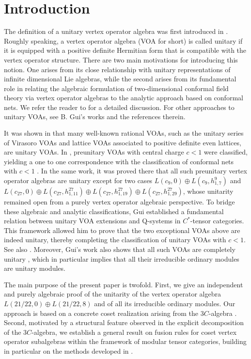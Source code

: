 \documentclass{article}
\begin{document}
	\section{Introduction}
	The definition of a unitary vertex operator algebra was first introduced in \cite{DLin1}. Roughly speaking, a vertex operator algebra (VOA for short) is called unitary if it is equipped with a positive definite Hermitian form that is compatible with the vertex operator structure. There are two main motivations for introducing this notion. One arises from its close relationship with unitary representations of infinite dimensional Lie algebras, while the second arises from its fundamental role in relating the algebraic formulation of two-dimensional conformal field theory via vertex operator algebras to the analytic approach based on conformal nets. We refer the reader to \cite{DLin1} for a detailed discussion. For other approaches to unitary VOAs, see B. Gui's works \cite{Gui1, Gui2, Gui3, Gui4} and the references therein.
	
	It was shown in \cite{DLin1} that many well-known rational VOAs, such as the unitary series of Virasoro VOAs and lattice VOAs associated to positive definite even lattices, are unitary VOAs. In \cite{DLin2}, preunitary VOAs with central charge $c<1$ were classified, yielding a one to one correspondence with the classification of conformal nets with $c<1$ \cite{KL}. In the same work, it was proved there that all such preunitary vertex operator algebras are unitary except for two cases $L(c_9, 0)\oplus L(c_9, h_{1,7}^9)$ and $L(c_{27}, 0)\oplus L(c_{27},h_{1,11}^{27})\oplus L(c_{27},h_{1,19}^{27})\oplus L(c_{27},h_{1,29}^{27})$,
	 whose unitarity remained open from a purely vertex operator algebraic perspective. To bridge these algebraic and analytic classifications, Gui \cite{Gui3} established a fundamental relation between unitary VOA extensions  and Q-systems \cite{Longo} in $C^*$-tensor categories. This framework allowed him to prove that the two exceptional VOAs above are indeed unitary, thereby  completing the classification of unitary VOAs with $c<1$.  See also \cite{CGGH}.
 Moreover, Gui's work also shows that all such VOAs are completely unitary \cite{Gui3}, which in particular implies that all their irreducible ordinary modules are unitary modules.
	
	 The main purpose of the present paper is twofold. First, we give an independent and purely algebraic proof of the unitarity of the vertex operator algebra $L(21/22, 0)\oplus L(21/22, 8)$ and of all its irreducible ordinary modules. Our approach is based on a concrete coset realization arising from the $3C$-algebra \cite{LYY}. Second, motivated by a structural feature observed in the explicit decomposition of the $3C$-algebra, we establish a general result on fusion rules for coset vertex operator subalgebras within the framework of modular tensor categories, building in particular on the methods developed in
\cite{DRX2}. 
\end{document}
